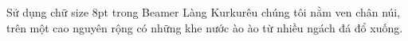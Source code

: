 \documentclass[8pt,a4paper]{beamer}
\begin{document}
\begin{frame}{Sử dụng chữ size 8pt trong Beamer}
\justifying
Làng Kurkurêu chúng tôi nằm ven chân núi, trên một cao nguyên rộng có những khe nước ào ào từ nhiều ngách đá đổ xuống.
\end{frame}
\end{document}
